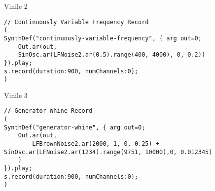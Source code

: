 Vinile 2

\begin{lstlisting}[style=SuperCollider-IDE]
// Continuously Variable Frequency Record
(
SynthDef("continuously-variable-frequency", { arg out=0;
    Out.ar(out,
    SinOsc.ar(LFNoise2.ar(0.5).range(400, 4000), 0, 0.2))
}).play;
s.record(duration:900, numChannels:0);
)
\end{lstlisting}

\clearpage

Vinile 3

\begin{lstlisting}[style=SuperCollider-IDE]
// Generator Whine Record
(
SynthDef("generator-whine", { arg out=0;
    Out.ar(out,
        LFBrownNoise2.ar(2000, 1, 0, 0.25) + SinOsc.ar(LFNoise2.ar(1234).range(9751, 10000),0, 0.012345)
    )
}).play;
s.record(duration:900, numChannels:0);
)
\end{lstlisting}
